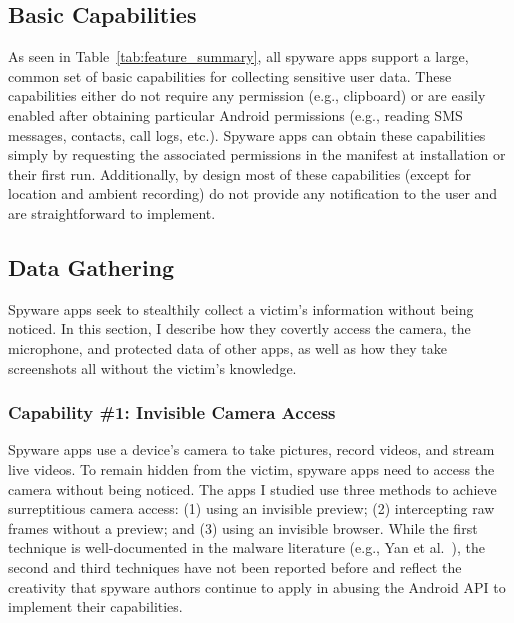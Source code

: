 \subsection{Basic Capabilities}
\label{subsec:features_enabled_by_permission}
As seen in Table~\ref{tab:feature_summary}, all spyware apps support a large, common set of basic capabilities for collecting sensitive user data.
These capabilities either do not require any permission (e.g., clipboard) or are easily enabled after obtaining particular Android permissions (e.g., reading SMS messages, contacts, call logs, etc.). Spyware apps can obtain these capabilities simply by
requesting the associated permissions in the manifest at installation or their first run.
Additionally, by design most of these capabilities
(except for location and ambient recording) do not provide any notification to
the user and are straightforward to implement.


\subsection{Data Gathering}
\label{subsec:data_gathering}
Spyware apps seek to stealthily collect a victim's information without being noticed. In this section, I describe how they covertly access the camera, the microphone, and protected data of other apps, as well as how they take screenshots all without the victim's knowledge.

\subsubsection*{Capability \#1: Invisible Camera Access}
\label{subsubsec:invisible_cam}
Spyware apps use a device's camera to take pictures, record videos, and stream live
videos. To remain hidden from the victim, spyware apps need to access the camera
without being noticed. The apps I studied use three methods to achieve
surreptitious camera access: (1) using an invisible preview; (2) intercepting raw
frames without a preview; and (3) using an invisible browser.
While the first technique is well-documented in the malware literature (e.g., Yan et al.~\cite{yan2019understanding}), the second and third techniques
have not been reported before and reflect
the creativity that spyware authors continue to apply in
abusing the Android API to implement their capabilities.




